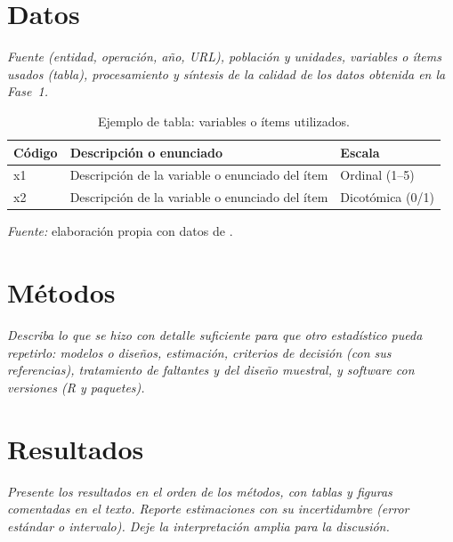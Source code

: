 \documentclass[11pt,letterpaper]{article}
\newcommand{\guia}[1]{{\color{gray}\itshape #1}}
\begin{document}
\section{Datos}
\label{sec:datos}

\guia{Fuente (entidad, operación, año, URL), población y unidades, variables o ítems usados
(tabla), procesamiento y síntesis de la calidad de los datos obtenida en la Fase~1.}

\begin{table}[ht]
\centering
\caption{Ejemplo de tabla: variables o ítems utilizados.}
\label{tab:variables}
\small
\begin{tabularx}{\textwidth}{@{}lXl@{}}
\toprule
\textbf{Código} & \textbf{Descripción o enunciado} & \textbf{Escala} \\
\midrule
x1 & Descripción de la variable o enunciado del ítem & Ordinal (1--5) \\
x2 & Descripción de la variable o enunciado del ítem & Dicotómica (0/1) \\
\bottomrule
\end{tabularx}

\smallskip
\parbox{\textwidth}{\footnotesize\textit{Fuente:} elaboración propia con datos de
\citet{dane2018cnpv}.}
\end{table}

\section{Métodos}
\label{sec:metodos}

\guia{Describa lo que se hizo con detalle suficiente para que otro estadístico pueda
repetirlo: modelos o diseños, estimación, criterios de decisión (con sus referencias),
tratamiento de faltantes y del diseño muestral, y software con versiones (R y paquetes).}

\section{Resultados}
\label{sec:resultados}

\guia{Presente los resultados en el orden de los métodos, con tablas y figuras comentadas en
el texto. Reporte estimaciones con su incertidumbre (error estándar o intervalo). Deje la
interpretación amplia para la discusión.}
\end{document}
